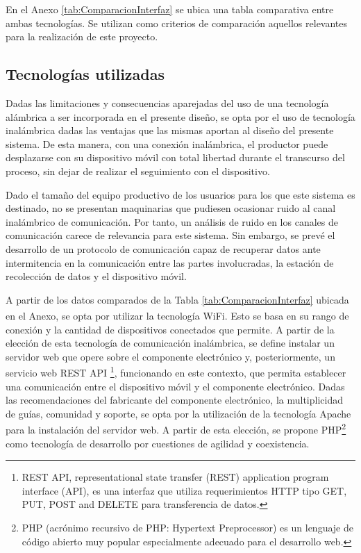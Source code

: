                 \par En el Anexo \ref{tab:ComparacionInterfaz} se ubica una tabla comparativa entre ambas tecnologías. Se utilizan como criterios de comparación aquellos relevantes para la realización de este proyecto. 
        
        \subsection{Tecnologías utilizadas}
            \par Dadas las limitaciones y consecuencias aparejadas del uso de una tecnología alámbrica a ser incorporada en el presente diseño, se opta por el uso de tecnología inalámbrica dadas las ventajas que las mismas aportan al diseño del presente sistema. De esta manera, con una conexión inalámbrica, el productor puede desplazarse con su dispositivo móvil con total libertad durante el transcurso del proceso, sin dejar de realizar el seguimiento con el dispositivo.
            
            \par Dado el tamaño del equipo productivo de los usuarios para los que este sistema es destinado, no se presentan maquinarias que pudiesen ocasionar ruido al canal inalámbrico de comunicación. Por tanto, un análisis de ruido en los canales de comunicación carece de relevancia para este sistema. Sin embargo, se prevé el desarrollo de un protocolo de comunicación capaz de recuperar datos ante intermitencia en la comunicación entre las partes involucradas, la estación de recolección de datos y el dispositivo móvil. 
            
            \par A partir de los datos comparados de la Tabla \ref{tab:ComparacionInterfaz} ubicada en el Anexo, se opta por utilizar la tecnología WiFi\textsuperscript{\textregistered}. Esto se basa en su rango de conexión y la cantidad de dispositivos conectados que permite. A partir de la elección de esta tecnología de comunicación inalámbrica, se define instalar un servidor web que opere sobre el componente electrónico y, posteriormente, un servicio web REST API \footnote{REST API, representational state transfer (REST) application program interface (API), es una interfaz que utiliza requerimientos HTTP tipo GET, PUT, POST and DELETE para transferencia de datos.}, funcionando en este contexto, que permita establecer una comunicación entre el dispositivo móvil y el componente electrónico. Dadas las recomendaciones del fabricante del componente electrónico, la multiplicidad de guías, comunidad y soporte, se opta por la utilización de la tecnología Apache para la instalación del servidor web. A partir de esta elección, se propone PHP\footnote{PHP (acrónimo recursivo de PHP: Hypertext Preprocessor) es un lenguaje de código abierto muy popular especialmente adecuado para el desarrollo web.} como tecnología de desarrollo por cuestiones de agilidad y coexistencia.
